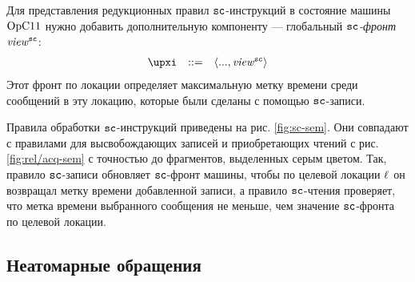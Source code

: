 Для представления редукционных правил ${\mathtt{sc}}$-инструкций в состояние машины $\mathrm{OpC11}$
нужно добавить дополнительную компоненту --- глобальный \emph{${\mathtt{sc}}$-фронт} $\mathit{view}^{\text{\scriptsize{\texttt{sc}}}}$:
\[\begin{array}{rcl}
\auxX & ::= & \angled{..., \stSC}
\end{array}\]
Этот фронт по локации определяет максимальную метку времени среди сообщений в эту локацию,
которые были сделаны с помощью ${\mathtt{sc}}$-записи.

Правила обработки ${\mathtt{sc}}$-инструкций приведены на рис. \ref{fig:sc-sem}.
Они совпадают с правилами для высвобождающих записей и приобретающих чтений с рис. \ref{fig:rel/acq-sem}
с точностью до фрагментов, выделенных серым цветом.
Так, правило ${\mathtt{sc}}$-записи обновляет ${\mathtt{sc}}$-фронт машины, чтобы по целевой локации $\ell$ он
возвращал метку времени добавленной записи, а правило ${\mathtt{sc}}$-чтения проверяет, что метка времени
выбранного сообщения не меньше, чем значение ${\mathtt{sc}}$-фронта по целевой локации.

\subsection{Неатомарные обращения}
\label{sec:opc11:formal:na}

